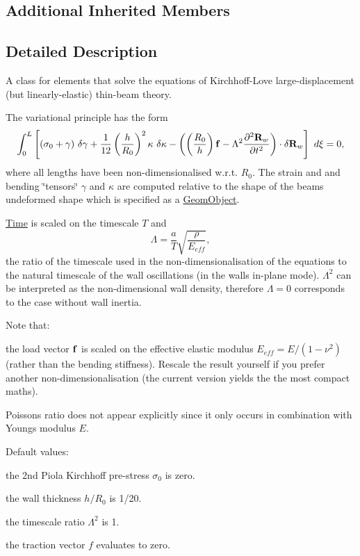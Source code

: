 \subsection*{Additional Inherited Members}


\subsection{Detailed Description}
A class for elements that solve the equations of Kirchhoff-\/\+Love large-\/displacement (but linearly-\/elastic) thin-\/beam theory.

The variational principle has the form \[ \int_0^{L} \left[ (\sigma_0 + \gamma) \ \delta \gamma + \frac{1}{12} \left(\frac{h}{R_0}\right)^2 \kappa \ \delta \kappa - \left( \left(\frac{R_0}{h}\right) {\bf f} - \Lambda^2 \frac{\partial^2 {\bf R}_w}{\partial t^2} \right) \cdot \delta {\bf R}_w \right] \ d\xi = 0, \] where all lengths have been non-\/dimensionalised w.\+r.\+t. $ R_0 $. The strain and and bending \char`\"{}tensors\char`\"{} $\gamma$ and $\kappa$ are computed relative to the shape of the beam\textquotesingle{}s undeformed shape which is specified as a \hyperlink{classoomph_1_1GeomObject}{Geom\+Object}.

\hyperlink{classoomph_1_1Time}{Time} is scaled on the timescale $T$ and \[ \Lambda = \frac{a}{T} \sqrt{\frac{\rho}{E_{eff}}}, \] the ratio of the timescale used in the non-\/dimensionalisation of the equations to the natural timescale of the wall oscillations (in the wall\textquotesingle{}s in-\/plane mode). $ \Lambda^2 $ can be interpreted as the non-\/dimensional wall density, therefore $ \Lambda=0$ corresponds to the case without wall inertia.

Note that\+:
\begin{DoxyItemize}
\item the load vector $ {\bf f} $ is scaled on the effective elastic modulus $ E_{eff}=E/(1-\nu^2)$ (rather than the bending stiffness). Rescale the result yourself if you prefer another non-\/dimensionalisation (the current version yields the the most compact maths).
\item Poisson\textquotesingle{}s ratio does not appear explicitly since it only occurs in combination with Young\textquotesingle{}s modulus $E$.
\end{DoxyItemize}

Default values\+:
\begin{DoxyItemize}
\item the 2nd Piola Kirchhoff pre-\/stress $ \sigma_0 $ is zero.
\item the wall thickness $ h/R_0$ is 1/20.
\item the timescale ratio $ \Lambda^2$ is 1.
\item the traction vector $ f $ evaluates to zero.
\end{DoxyItemize}

